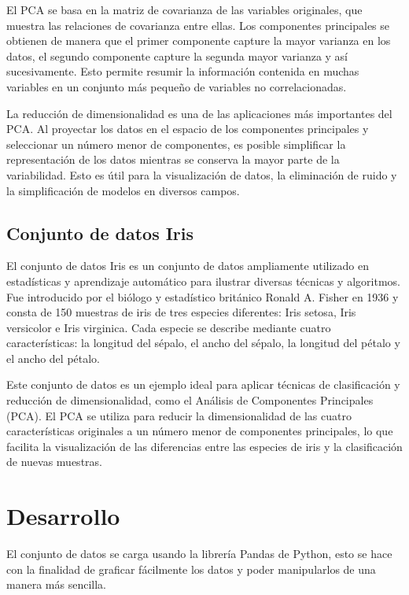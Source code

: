 \documentclass[conference]{IEEEtran}
\begin{document}
El PCA se basa en la matriz de covarianza de las variables originales, que muestra las relaciones de covarianza entre ellas. Los componentes principales se obtienen de manera que el primer componente capture la mayor varianza en los datos, el segundo componente capture la segunda mayor varianza y así sucesivamente. Esto permite resumir la información contenida en muchas variables en un conjunto más pequeño de variables no correlacionadas.

La reducción de dimensionalidad es una de las aplicaciones más importantes del PCA. Al proyectar los datos en el espacio de los componentes principales y seleccionar un número menor de componentes, es posible simplificar la representación de los datos mientras se conserva la mayor parte de la variabilidad. Esto es útil para la visualización de datos, la eliminación de ruido y la simplificación de modelos en diversos campos.

\subsection{Conjunto de datos Iris}

El conjunto de datos Iris es un conjunto de datos ampliamente utilizado en estadísticas y aprendizaje automático para ilustrar diversas técnicas y algoritmos. Fue introducido por el biólogo y estadístico británico Ronald A. Fisher en 1936 y consta de 150 muestras de iris de tres especies diferentes: Iris setosa, Iris versicolor e Iris virginica. Cada especie se describe mediante cuatro características: la longitud del sépalo, el ancho del sépalo, la longitud del pétalo y el ancho del pétalo.

Este conjunto de datos es un ejemplo ideal para aplicar técnicas de clasificación y reducción de dimensionalidad, como el Análisis de Componentes Principales (PCA). El PCA se utiliza para reducir la dimensionalidad de las cuatro características originales a un número menor de componentes principales, lo que facilita la visualización de las diferencias entre las especies de iris y la clasificación de nuevas muestras.


\section{Desarrollo}

El conjunto de datos se carga usando la librería Pandas de Python, esto se hace con la finalidad de graficar fácilmente los datos y poder manipularlos de una manera más sencilla.
\end{document}
